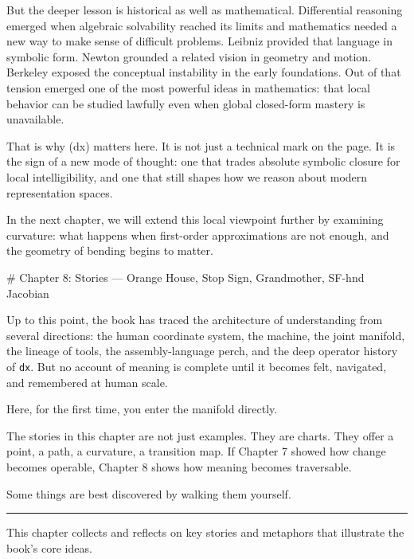 \documentclass[
]{article}
\begin{document}
But the deeper lesson is historical as well as mathematical.
Differential reasoning emerged when algebraic solvability reached its
limits and mathematics needed a new way to make sense of difficult
problems. Leibniz provided that language in symbolic form. Newton
grounded a related vision in geometry and motion. Berkeley exposed the
conceptual instability in the early foundations. Out of that tension
emerged one of the most powerful ideas in mathematics: that local
behavior can be studied lawfully even when global closed-form mastery is
unavailable.

That is why (dx) matters here. It is not just a technical mark on the
page. It is the sign of a new mode of thought: one that trades absolute
symbolic closure for local intelligibility, and one that still shapes
how we reason about modern representation spaces.

In the next chapter, we will extend this local viewpoint further by
examining curvature: what happens when first-order approximations are
not enough, and the geometry of bending begins to matter.

\newpage
\vspace*{3cm}
\begin{center}
# Chapter 8: Stories — Orange House, Stop Sign, Grandmother, SF-hnd Jacobian
\end{center}

Up to this point, the book has traced the architecture of understanding
from several directions: the human coordinate system, the machine, the
joint manifold, the lineage of tools, the assembly-language perch, and
the deep operator history of \texttt{dx}. But no account of meaning is
complete until it becomes felt, navigated, and remembered at human
scale.

Here, for the first time, you enter the manifold directly.

The stories in this chapter are not just examples. They are charts. They
offer a point, a path, a curvature, a transition map. If Chapter 7
showed how change becomes operable, Chapter 8 shows how meaning becomes
traversable.

Some things are best discovered by walking them yourself.

\begin{center}\rule{0.5\linewidth}{0.5pt}\end{center}

This chapter collects and reflects on key stories and metaphors that
illustrate the book's core ideas.
\end{document}
